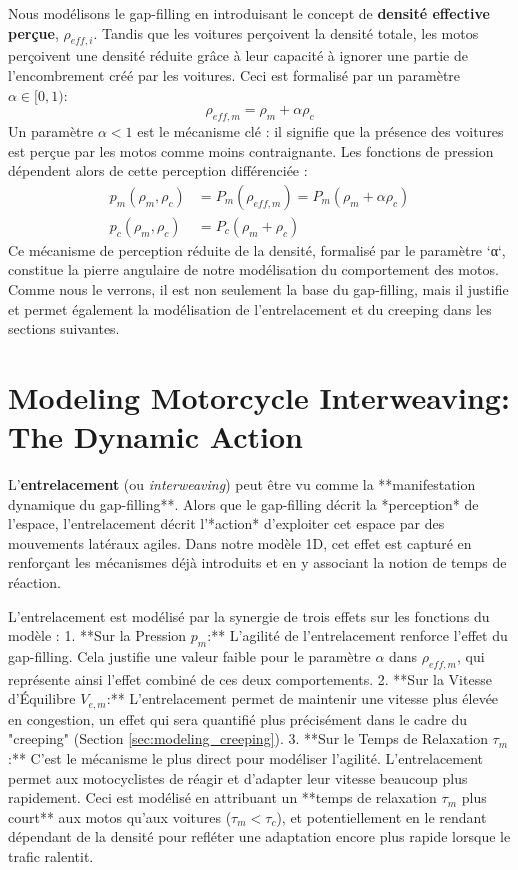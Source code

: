 Nous modélisons le gap-filling en introduisant le concept de \textbf{densité effective perçue}, \( \rho_{eff,i} \). Tandis que les voitures perçoivent la densité totale, les motos perçoivent une densité réduite grâce à leur capacité à ignorer une partie de l'encombrement créé par les voitures. Ceci est formalisé par un paramètre \( \alpha \in [0, 1) \):
\begin{equation}
    \label{eq:rho_eff_m}
    \rho_{eff,m} = \rho_m + \alpha \rho_c
\end{equation}
Un paramètre \( \alpha < 1 \) est le mécanisme clé : il signifie que la présence des voitures est perçue par les motos comme moins contraignante. Les fonctions de pression dépendent alors de cette perception différenciée :
\begin{align}
    p_m(\rho_m, \rho_c) &= P_m(\rho_{eff,m}) = P_m(\rho_m + \alpha \rho_c) \\
    p_c(\rho_m, \rho_c) &= P_c(\rho_m + \rho_c)
\end{align}
Ce mécanisme de perception réduite de la densité, formalisé par le paramètre `α`, constitue la pierre angulaire de notre modélisation du comportement des motos. Comme nous le verrons, il est non seulement la base du gap-filling, mais il justifie et permet également la modélisation de l'entrelacement et du creeping dans les sections suivantes.

\section{Modeling Motorcycle Interweaving: The Dynamic Action}
\label{sec:modeling_interweaving}

L'\textbf{entrelacement} (ou \textit{interweaving}) peut être vu comme la **manifestation dynamique du gap-filling**. Alors que le gap-filling décrit la *perception* de l'espace, l'entrelacement décrit l'*action* d'exploiter cet espace par des mouvements latéraux agiles. Dans notre modèle 1D, cet effet est capturé en renforçant les mécanismes déjà introduits et en y associant la notion de temps de réaction.

L'entrelacement est modélisé par la synergie de trois effets sur les fonctions du modèle :
1.  **Sur la Pression \( p_m \):** L'agilité de l'entrelacement renforce l'effet du gap-filling. Cela justifie une valeur faible pour le paramètre \( \alpha \) dans \( \rho_{eff,m} \), qui représente ainsi l'effet combiné de ces deux comportements.
2.  **Sur la Vitesse d'Équilibre \( V_{e,m} \):** L'entrelacement permet de maintenir une vitesse plus élevée en congestion, un effet qui sera quantifié plus précisément dans le cadre du "creeping" (Section \ref{sec:modeling_creeping}).
3.  **Sur le Temps de Relaxation \( \tau_m \):** C'est le mécanisme le plus direct pour modéliser l'agilité. L'entrelacement permet aux motocyclistes de réagir et d'adapter leur vitesse beaucoup plus rapidement. Ceci est modélisé en attribuant un **temps de relaxation \( \tau_m \) plus court** aux motos qu'aux voitures (\( \tau_m < \tau_c \)), et potentiellement en le rendant dépendant de la densité pour refléter une adaptation encore plus rapide lorsque le trafic ralentit.


